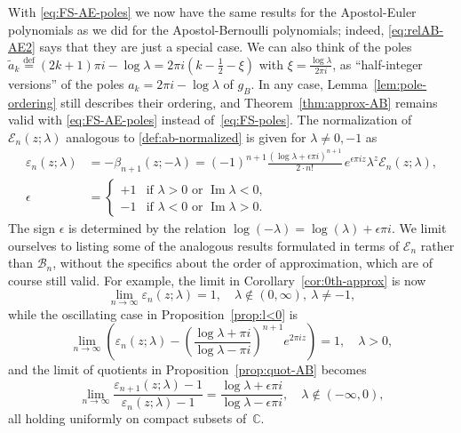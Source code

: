\documentclass[11pt,a4paper]{amsart}
\newcommand{\C}{\mathbb{C}}
\newcommand{\B}{\mathcal{B}}
\newcommand{\E}{\mathcal{E}}
\renewcommand{\Im}{\operatorname{Im}}
\newcommand{\eqdef}{\overset{\mathrm{def}}{=}}
\theoremstyle{plain}
\theoremstyle{remark}
\begin{document}
With \eqref{eq:FS-AE-poles} we now have the same results for the Apostol-Euler polynomials as we did for the Apostol-Bernoulli polynomials; indeed, \eqref{eq:relAB-AE2} says that they are just a special case. We can also think of the poles
$
	\widetilde{a}_k \eqdef (2k + 1) \pi i - \log\lambda
	           =      2\pi i \left( k - \tfrac{1}{2} - \xi \right)
$
with $\xi = \frac{\log\lambda}{2\pi i}$, as ``half-integer versions'' of the poles
$a_{k} = 2\pi i - \log\lambda$ of $g_{B}$. In any case, Lemma~\ref{lem:pole-ordering} still describes their ordering, and Theorem~\ref{thm:approx-AB} remains valid with \eqref{eq:FS-AE-poles} instead of~\eqref{eq:FS-poles}. The normalization of $\E_{n}(z;\lambda)$ analogous to
\eqref{def:ab-normalized} is given for $\lambda \neq 0,-1$ as
%
\begin{equation}
\label{def:ae-normalized}
\begin{aligned}
	 \varepsilon_{n}(z;\lambda) 
  &= -\beta_{n+1}(z;-\lambda)
   = (-1)^{n+1} \frac{(\log\lambda + \epsilon \pi i)^{n+1}}{2 \cdot n!} 
               \,e^{\epsilon \pi i z} \lambda^{z} \E_{n}(z;\lambda),
  \\
     \epsilon
  &= \begin{cases}
		+1 & \text{if $\lambda > 0$ or $\Im\lambda < 0$,}
		   \\
		-1 & \text{if $\lambda < 0$ or $\Im\lambda > 0$.}
	 \end{cases}               
\end{aligned}
\end{equation}
%
The sign $\epsilon$ is determined by the relation $\log(-\lambda) = \log(\lambda) + \epsilon \pi i$.  We limit ourselves to listing some of the analogous results formulated in terms of $\E_{n}$ rather than $\B_{n}$, without the specifics about the order of approximation, which are of course still valid. For example, the limit in Corollary~\ref{cor:0th-approx} is now
\begin{equation}
\label{eq:0th-approx-AE}
	   \lim_{n \to \infty} \varepsilon_{n}(z;\lambda)
	 = 1,
	 \quad \lambda \notin (0,\infty),\ \lambda \neq -1,
\end{equation}
while the oscillating case in Proposition~\ref{prop:l<0} is
\begin{equation}
\label{eq:AEl>0}
	     \lim_{n \to \infty} \left( \varepsilon_{n}(z;\lambda)
	   - \left(\frac{\log\lambda + \pi i}{\log\lambda - \pi i}\right)^{n+1} e^{2\pi i z} \right)
	 = 1,
	 \quad \lambda >0,
\end{equation}
and the limit of quotients in Proposition~\ref{prop:quot-AB} becomes
\begin{equation}
\label{eq:quot-AE}
	 \lim_{n \to \infty} \frac{\varepsilon_{n+1}(z;\lambda) - 1}{\varepsilon_{n}(z;\lambda) - 1}
	 = \frac{\log\lambda + \epsilon \pi i}{\log\lambda - \epsilon \pi i},
	 \quad
	 \lambda \notin (-\infty,0),
\end{equation}
all holding uniformly on compact subsets of~$\C$.
\end{document}
